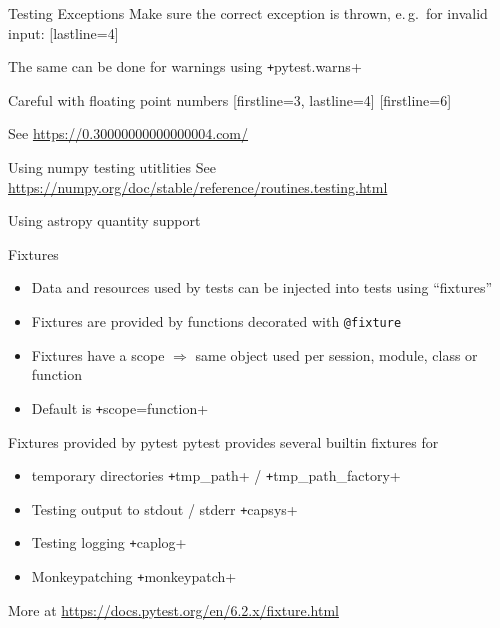 \begin{frame}[c]{Testing Exceptions}
  Make sure the correct exception is thrown, e.\,g.\ for invalid input:
  [lastline=4]

  The same can be done for warnings using \texttt+pytest.warns+
\end{frame}


\begin{frame}[c, fragile]{Careful with floating point numbers}
  [firstline=3, lastline=4]
  [firstline=6]

  See \url{https://0.30000000000000004.com/}
\end{frame}

\begin{frame}[c, fragile]{Using numpy testing utitlities}
  See \url{https://numpy.org/doc/stable/reference/routines.testing.html}
\end{frame}

\begin{frame}[c, fragile]{Using astropy quantity support}
\end{frame}

\begin{frame}[c]{Fixtures}
  \begin{itemize}
    \item Data and resources used by tests can be injected into tests using \enquote{fixtures}
    \item Fixtures are provided by functions decorated with \texttt{@fixture}
    \item Fixtures have a scope $⇒$ same object used per session, module, class or function
    \item Default is \texttt+scope=function+
  \end{itemize}
\end{frame}

\begin{frame}[c]{Fixtures provided by pytest}
  pytest provides several builtin fixtures for
  \begin{itemize}
    \item temporary directories \texttt+tmp_path+ / \texttt+tmp_path_factory+
    \item Testing output to stdout / stderr \texttt+capsys+
    \item Testing logging \texttt+caplog+
    \item Monkeypatching \texttt+monkeypatch+
  \end{itemize}
  More at \url{https://docs.pytest.org/en/6.2.x/fixture.html}
\end{frame}

